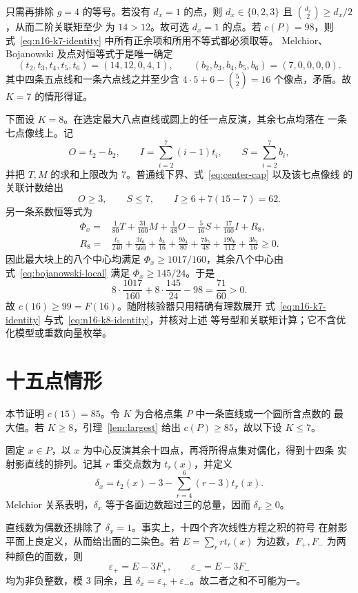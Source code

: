 \documentclass[11pt,a4paper]{ctexart}
\theoremstyle{definition}
\begin{document}
只需再排除 \(g=4\) 的等号。若没有 \(d_x=1\) 的点，则
\(d_x\in\{0,2,3\}\) 且 \(\binom{d_x}{2}\ge d_x/2\)，从而二阶关联矩至少
为 \(14>12\)。故可选 \(d_x=1\) 的点。若 \(c(P)=98\)，则
式~\eqref{eq:n16-k7-identity} 中所有正余项和所用不等式都必须取等。
Melchior、Bojanowski 及点对恒等式于是唯一确定
\[
 (t_2,t_3,t_4,t_5,t_6)=(14,12,0,4,1),\qquad
 (b_2,b_3,b_4,b_5,b_6)=(7,0,0,0,0).
\]
其中四条五点线和一条六点线之并至少含
\(4\cdot5+6-\binom52=16\) 个像点，矛盾。故 \(K=7\) 的情形得证。

下面设 \(K=8\)。在选定最大八点直线或圆上的任一点反演，其余七点均落在
一条七点像线上。记
\[
 O=t_2-b_2,\qquad I=\sum_{i=2}^7(i-1)t_i,\qquad
 S=\sum_{i=2}^7b_i,
\]
并把 \(T,M\) 的求和上限改为 \(7\)。普通线下界、式~\eqref{eq:center-cap}
以及该七点像线
的关联计数给出
\[
 O\ge3,\qquad S\le7,\qquad I\ge6+7(15-7)=62.
\]
另一条系数恒等式为
\begin{equation}\label{eq:n16-k8-identity}
\begin{split}
 \Phi_x={}&\frac1{80}T+\frac{31}{160}M+\frac1{48}O
        -\frac5{16}S+\frac{17}{160}I+R_8,\\
 R_8={}&\frac{t_5}{240}+\frac{3t_6}{560}+\frac{b_3}{16}
 +\frac{9b_4}{80}+\frac{7b_5}{48}+\frac{19b_6}{112}
 +\frac{3b_7}{16}\ge0.
\end{split}
\end{equation}
因此最大块上的八个中心均满足 \(\Phi_x\ge1017/160\)，其余八个中心由
式~\eqref{eq:bojanowski-local} 满足 \(\Phi_x\ge145/24\)。于是
\[
 8\cdot\frac{1017}{160}+8\cdot\frac{145}{24}-98=\frac{71}{60}>0.
\]
故 $c(16)\ge99=F(16)$。随附核验器只用精确有理数展开
式~\eqref{eq:n16-k7-identity} 与式~\eqref{eq:n16-k8-identity}，并核对上述
等号型和关联矩计算；它不含优化模型或重数向量枚举。

\section{十五点情形}\label{sec:n15}

本节证明 $c(15)=85$。令 $K$ 为合格点集 $P$ 中一条直线或一个圆所含点数的
最大值。若 $K\ge8$，引理~\ref{lem:largest} 给出 $c(P)\ge85$，故以下设
$K\le7$。

固定 $x\in P$，以 $x$ 为中心反演其余十四点，再将所得点集对偶化，得到十四条
实射影直线的排列。记其 $r$ 重交点数为 $t_r(x)$，并定义
\[
 \delta_x=t_2(x)-3-\sum_{r=4}^{6}(r-3)t_r(x).
\]
Melchior 关系表明，$\delta_x$ 等于各面边数超过三的总量，因而
$\delta_x\ge0$。

直线数为偶数还排除了 $\delta_x=1$。事实上，十四个齐次线性方程之积的符号
在射影平面上良定义，从而给出面的二染色。若
$E=\sum_r r t_r(x)$ 为边数，$F_+,F_-$ 为两种颜色的面数，则
\[
 \varepsilon_+=E-3F_+,
 \qquad \varepsilon_-=E-3F_-
\]
均为非负整数，模 $3$ 同余，且
$\delta_x=\varepsilon_++\varepsilon_-$。故二者之和不可能为一。
\end{document}
